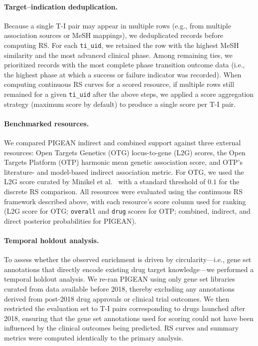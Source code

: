 
\paragraph{Target--indication deduplication.}
Because a single T-I pair may appear in multiple rows (e.g., from multiple association sources or MeSH mappings), we deduplicated records before computing RS. For each \texttt{ti\_uid}, we retained the row with the highest MeSH similarity and the most advanced clinical phase. Among remaining ties, we prioritized records with the most complete phase transition outcome data (i.e., the highest phase at which a success or failure indicator was recorded). When computing continuous RS curves for a scored resource, if multiple rows still remained for a given \texttt{ti\_uid} after the above steps, we applied a score aggregation strategy (maximum score by default) to produce a single score per T-I pair.

\paragraph{Benchmarked resources.}
We compared PIGEAN indirect and combined support against three external resources: Open Targets Genetics (OTG) locus-to-gene (L2G) scores, the Open Targets Platform (OTP) harmonic mean genetic association score, and OTP's literature- and model-based indirect association metric. For OTG, we used the L2G score curated by Minikel et al.\ \cite{minikel_refining_2024} with a standard threshold of $0.1$ for the discrete RS comparison. All resources were evaluated using the continuous RS framework described above, with each resource's score column used for ranking (L2G score for OTG; \texttt{overall} and \texttt{drug} scores for OTP; combined, indirect, and direct posterior probabilities for PIGEAN).


\paragraph{Temporal holdout analysis.}
To assess whether the observed enrichment is driven by circularity---i.e., gene set annotations that directly encode existing drug target knowledge---we performed a temporal holdout analysis. We re-ran PIGEAN using only gene set libraries curated from data available before 2018, thereby excluding any annotations derived from post-2018 drug approvals or clinical trial outcomes. We then restricted the evaluation set to T-I pairs corresponding to drugs launched after 2018, ensuring that the gene set annotations used for scoring could not have been influenced by the clinical outcomes being predicted. RS curves and summary metrics were computed identically to the primary analysis.

